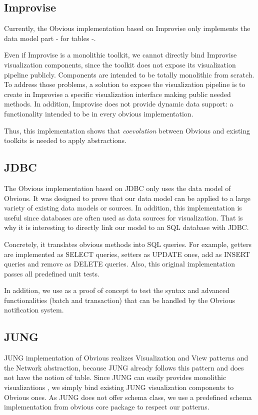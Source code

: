 \subsection{Improvise}

Currently, the Obvious implementation based on Improvise only implements the data model part - for tables -.

Even if Improvise is a monolithic toolkit, we cannot directly bind Improvise visualization components, since the toolkit does not expose its visualization pipeline publicly. Components are intended to be totally monolithic from scratch. To address those problems, a solution to expose the visualization pipeline is to create in Improvise a specific visualization interface making public needed methods. In addition, Improvise does not provide dynamic data support: a functionality intended to be in every obvious implementation.

Thus, this implementation shows that \emph{coevolution} between Obvious and existing toolkits is needed to apply abstractions.

\subsection{JDBC}

The Obvious implementation based on JDBC only uses the data model of Obvious. It was designed to prove that our data model can be applied to a large variety of existing data models or sources. In addition, this implementation is useful since databases are often used as data sources for visualization. That is why it is interesting to directly link our model to an SQL database with JDBC.

Concretely, it  translates obvious methods into SQL queries. For example, getters are implemented as SELECT queries, setters as UPDATE ones, add as INSERT queries and remove as DELETE queries. Also, this original implementation passes all predefined unit tests.

In addition, we use as a proof of concept to test the syntax and advanced functionalities (batch and transaction) that can be handled by the Obvious notification system.

\subsection{JUNG}

JUNG implementation of Obvious realizes Visualization and View patterns and the Network abstraction, because JUNG already follows this pattern and does not have the notion of table. Since JUNG can easily provides monolithic visualizations , we simply bind existing JUNG visualization components to Obvious ones. As JUNG does not offer schema class, we use a predefined schema implementation from obvious core package to respect our patterns.

